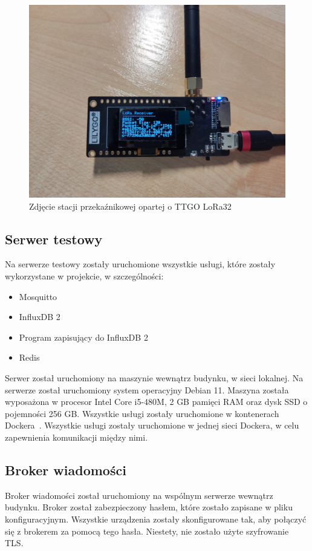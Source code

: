 \begin{figure}[b!]
    \begin{center}
        \includegraphics[width=13cm]{pic/stacja1.jpg}
    \end{center}
    \caption{Zdjęcie stacji przekaźnikowej opartej o TTGO LoRa32}\label{rys:stacja1}
\end{figure}


\subsection{Serwer testowy}
Na serwerze testowy zostały uruchomione wszystkie usługi, które zostały wykorzystane w projekcie, w szczególności:
\begin{itemize}
    \item Mosquitto
    \item InfluxDB 2
    \item Program zapisujący do InfluxDB 2
    \item Redis
\end{itemize}
Serwer został uruchomiony na maszynie wewnątrz budynku, w sieci lokalnej. Na serwerze został uruchomiony system operacyjny Debian 11. Maszyna została wyposażona w procesor Intel Core i5-480M, 2 GB pamięci RAM oraz dysk SSD o pojemności 256 GB. Wszystkie usługi zostały uruchomione w kontenerach Dockera~\cite{tool:docker}. Wszystkie usługi zostały uruchomione w jednej sieci Dockera, w celu zapewnienia komunikacji między nimi.

\subsection{Broker wiadomości}
Broker wiadomości został uruchomiony na wspólnym serwerze wewnątrz budynku. Broker został zabezpieczony hasłem, które zostało zapisane w pliku konfiguracyjnym. Wszystkie urządzenia zostały skonfigurowane tak, aby połączyć się z brokerem za pomocą tego hasła. Niestety, nie zostało użyte szyfrowanie TLS.

